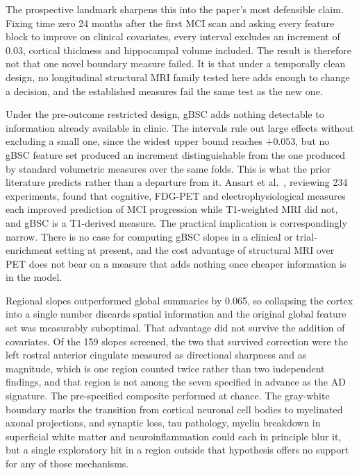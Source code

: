 \documentclass[blue]{ludusofficial}  %
\begin{document}
The prospective landmark sharpens this into the paper's most defensible claim. Fixing time zero 24 months after the first MCI scan and asking every feature block to improve on clinical covariates, every interval excludes an increment of 0.03, cortical thickness and hippocampal volume included. The result is therefore not that one novel boundary measure failed. It is that under a temporally clean design, no longitudinal structural MRI family tested here adds enough to change a decision, and the established measures fail the same test as the new one.

Under the pre-outcome restricted design, gBSC adds nothing detectable to information already available in clinic. The intervals rule out large effects without excluding a small one, since the widest upper bound reaches $+0.053$, but no gBSC feature set produced an increment distinguishable from the one produced by standard volumetric measures over the same folds. This is what the prior literature predicts rather than a departure from it. Ansart et al.~\cite{ansart2021predicting}, reviewing 234 experiments, found that cognitive, FDG-PET and electrophysiological measures each improved prediction of MCI progression while T1-weighted MRI did not, and gBSC is a T1-derived measure. The practical implication is correspondingly narrow. There is no case for computing gBSC slopes in a clinical or trial-enrichment setting at present, and the cost advantage of structural MRI over PET does not bear on a measure that adds nothing once cheaper information is in the model.

Regional slopes outperformed global summaries by 0.065, so collapsing the cortex into a single number discards spatial information and the original global feature set was measurably suboptimal. That advantage did not survive the addition of covariates. Of the 159 slopes screened, the two that survived correction were the left rostral anterior cingulate measured as directional sharpness and as magnitude, which is one region counted twice rather than two independent findings, and that region is not among the seven specified in advance as the AD signature. The pre-specified composite performed at chance. The gray-white boundary marks the transition from cortical neuronal cell bodies to myelinated axonal projections, and synaptic loss, tau pathology, myelin breakdown in superficial white matter and neuroinflammation could each in principle blur it, but a single exploratory hit in a region outside that hypothesis offers no support for any of those mechanisms.
\end{document}
